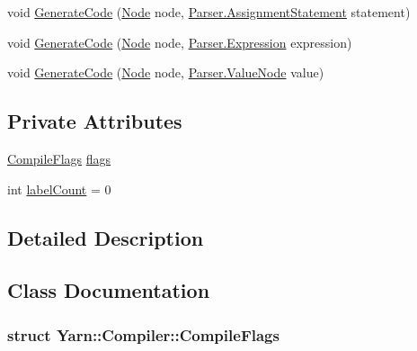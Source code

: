 \begin{DoxyCompactItemize}
\item 
void \hyperlink{a00043_afb86d9228f66896abe31d47d72a267ce}{Generate\-Code} (\hyperlink{a00040_a00181}{Node} node, \hyperlink{a00033}{Parser.\-Assignment\-Statement} statement)
\item 
void \hyperlink{a00043_a5c762915320958c3a03b193b06a7e279}{Generate\-Code} (\hyperlink{a00040_a00181}{Node} node, \hyperlink{a00054}{Parser.\-Expression} expression)
\item 
void \hyperlink{a00043_a41438a0b25f2668a180372d05127d891}{Generate\-Code} (\hyperlink{a00040_a00181}{Node} node, \hyperlink{a00101}{Parser.\-Value\-Node} value)
\end{DoxyCompactItemize}
\subsection*{Private Attributes}
\begin{DoxyCompactItemize}
\item 
\hyperlink{a00043_a00178}{Compile\-Flags} \hyperlink{a00043_a541022d89bcf9bc8f794eb6d6b438d08}{flags}
\item 
int \hyperlink{a00043_a87758397eba2e84cda8e0d6c40656f3f}{label\-Count} = 0
\end{DoxyCompactItemize}


\subsection{Detailed Description}


\subsection{Class Documentation}
\label{a00178}
\hypertarget{a00043_a00178}{}
\subsubsection{struct Yarn\-:\-:Compiler\-:\-:Compile\-Flags}


